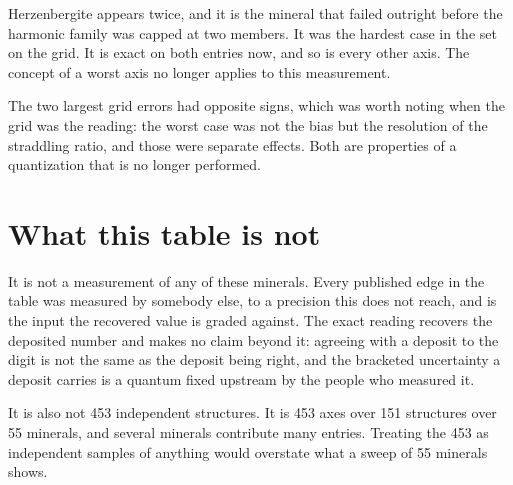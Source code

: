 Herzenbergite appears twice, and it is the mineral that failed outright before the harmonic family was capped at two members. It was the hardest case in the set on the grid. It is exact on both entries now, and so is every other axis. The concept of a worst axis no longer applies to this measurement.

The two largest grid errors had opposite signs, which was worth noting when the grid was the reading: the worst case was not the bias but the resolution of the straddling ratio, and those were separate effects. Both are properties of a quantization that is no longer performed.

\section{What this table is not}

It is not a measurement of any of these minerals. Every published edge in the table was measured by somebody else, to a precision this does not reach, and is the input the recovered value is graded against. The exact reading recovers the deposited number and makes no claim beyond it: agreeing with a deposit to the digit is not the same as the deposit being right, and the bracketed uncertainty a deposit carries is a quantum fixed upstream by the people who measured it.

It is also not 453 independent structures. It is 453 axes over 151 structures over 55 minerals, and several minerals contribute many entries. Treating the 453 as independent samples of anything would overstate what a sweep of 55 minerals shows.
